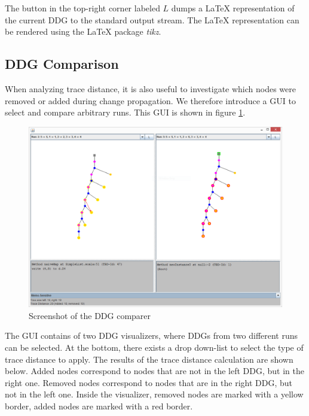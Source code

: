 The button in the top-right corner labeled $L$ dumps a \LaTeX \hspace{0.5mm} representation of the current DDG to the standard output stream. The \LaTeX \hspace{0.5mm} representation can be rendered using the \LaTeX \hspace{0.5mm} package \textit{tikz}. 

\subsection{DDG Comparison}

When analyzing trace distance, it is also useful to investigate which nodes were removed or added during change propagation. We therefore introduce a GUI to select and compare arbitrary runs. This GUI is shown in figure \ref{fig:ddg_diff_ui}. 

\begin{figure}
\begin{center}
\includegraphics[scale=0.5]{screens/DiffView.png}
\end{center}
\caption{Screenshot of the DDG comparer}
\label{fig:ddg_diff_ui}
\end{figure}

The GUI contains of two DDG visualizers, where DDGs from two different runs can be selected. At the bottom, there exists a drop down-list to select the type of trace distance to apply. The results of the trace distance calculation are shown below. Added nodes correspond to nodes that are not in the left DDG, but in the right one. Removed nodes correspond to nodes that are in the right DDG, but not in the left one. Inside the visualizer, removed nodes are marked with a yellow border, added nodes are marked with a red border.

